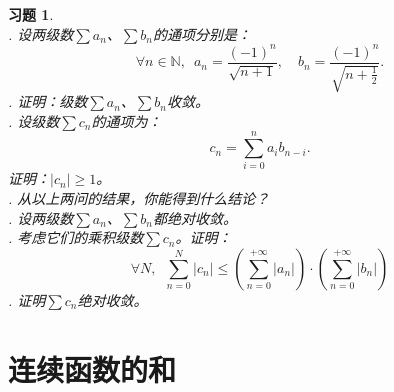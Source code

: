 \documentclass[12pt,UTF8]{ctexbook}
\theoremstyle{definition}
\theoremstyle{plain}
\newtheorem{xt}{习题}[section]
\begin{document}
\begin{xt}
    \mbox{} \\
    . 设两级数$\sum a_n$、$\sum b_n$的通项分别是：
    $$ \forall n\in\mathbb{N}, \,\,\, a_n = \frac{(-1)^n}{\sqrt{n+1}}, \quad b_n = \frac{(-1)^n}{\sqrt{n+\frac{1}{2}}}. $$
    . 证明：级数$\sum a_n$、$\sum b_n$收敛。\\
    . 设级数$\sum c_n$的通项为：
    $$ c_n = \sum_{i=0}^n a_i b_{n-i} . $$
    \indent 证明：$|c_n| \geqslant 1$。\\
    . 从以上两问的结果，你能得到什么结论？\\
    . 设两级数$\sum a_n$、$\sum b_n$都绝对收敛。\\
    . 考虑它们的乘积级数$\sum c_n$。证明：
    $$ \forall N, \,\,\, \sum_{n=0}^{N} |c_n| \leqslant \left(\sum_{n=0}^{+\infty} |a_n| \right) \cdot \left(\sum_{n=0}^{+\infty} |b_n| \right)$$
    . 证明$\sum c_n$绝对收敛。
\end{xt}

\chapter{连续函数的和}
\end{document}
